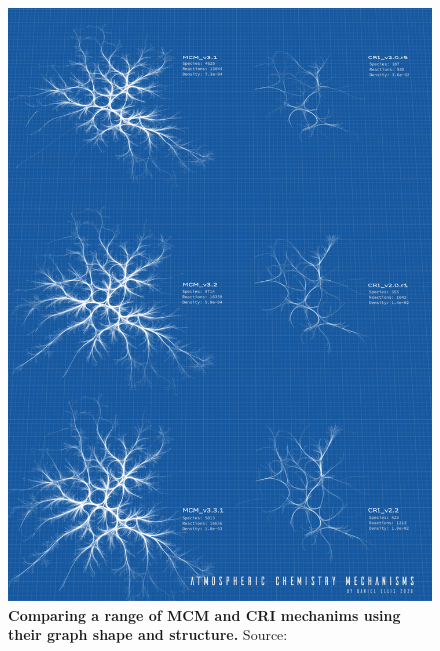 \begin{figure}[H]
     \centering
         \includegraphics[width=1\textwidth]{poster.png}
        \caption{\textbf{Comparing a range of MCM and CRI mechanims using their graph shape and structure.} Source: \cite{mcmblue}}
        \label{fig:graphc1}
\end{figure}




